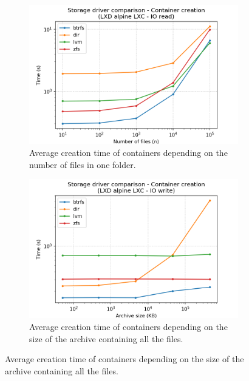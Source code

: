 \begin{figure}[!h]
    \begin{subfigure}{.5\textwidth}
      \centering
      \includegraphics[width=\linewidth]{images/storage-driver/storage-driver-creation-LXD-alpine-LXC---IO-read.png}
      \caption{Average creation time of containers depending on the number of files in one folder.}
      \label{fig:storage-driver:lxc:io-read-create}
    \end{subfigure}
    \begin{subfigure}{.5\textwidth}
      \centering
      \includegraphics[width=\linewidth]{images/storage-driver/storage-driver-creation-LXD-alpine-LXC---IO-write.png}
      \caption{Average creation time of containers depending on the size of the archive containing all the files.}
      \label{fig:storage-driver:lxc:io-write-create}
    \end{subfigure}
    

\end{figure}
